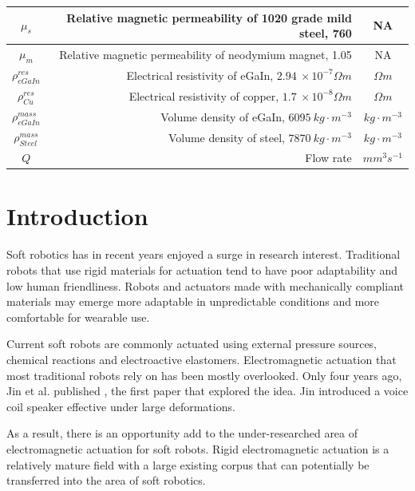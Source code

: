 \documentclass[a4paper,12pt]{article}
\begin{document}
\begin{center}
\begin{tabular}{c | D | c}
        $\mu_s$ & Relative magnetic permeability of 1020 grade mild steel, 760 \cite{baartmanMaterialsLibraryFEMM2007} & NA \\
        \hline
        $\mu_m$ & Relative magnetic permeability of neodymium magnet, 1.05 \cite{engineeringtoolboxPermeability2016} & NA \\
        \hline
        $\rho^{res}_{eGaIn}$ & Electrical resistivity of eGaIn, $2.94\ \times10^{-7} \Omega m$ \cite{zrnicResistivitySurfaceTension1969} & $\Omega m$ \\
        \hline
        $\rho^{res}_{Cu}$ & Electrical resistivity of copper, $1.7\ \times10^{-8} \Omega m$ \cite{dickeyEutecticGalliumIndiumEGaIn2008} & $\Omega m$ \\
        \hline
        $\rho^{mass}_{eGaIn}$ & Volume density of eGaIn, $6095\ kg\cdot m^{-3}$\cite{xuEffectOxidationMechanical2012} & $kg\cdot m^{-3}$ \\
        \hline
        $\rho^{mass}_{Steel}$ & Volume density of steel, $7870\ kg\cdot m^{-3}$ \cite{saysAISI1020Carbon2013} & $kg\cdot m^{-3}$ \\
        \hline
        $Q$ & Flow rate & $mm^3s^{-1}$
    \end{tabular}
\end{center}

\newpage

\section{Introduction}

Soft robotics has in recent years enjoyed a surge in research interest. Traditional robots that use rigid materials for actuation tend to have poor adaptability and low human friendliness. Robots and actuators made with mechanically compliant materials may emerge more adaptable in unpredictable conditions and more comfortable for wearable use.

Current soft robots are commonly actuated using external pressure sources, chemical reactions and electroactive elastomers. Electromagnetic actuation that most traditional robots rely on has been mostly overlooked. Only four years ago, Jin et al. published \cite{jinStretchableLoudspeakerUsing2015}, the first paper that explored the idea. Jin introduced a voice coil speaker effective under large deformations.

As a result, there is an opportunity add to the under-researched area of electromagnetic actuation for soft robots. Rigid electromagnetic actuation is a relatively mature field with a large existing corpus that can potentially be transferred into the area of soft robotics.
\end{document}
